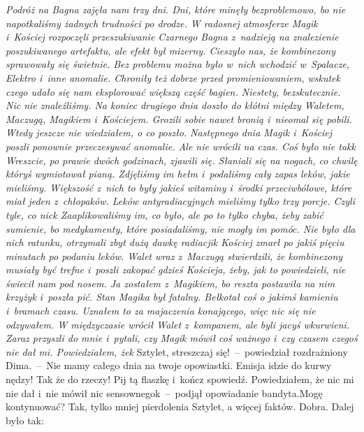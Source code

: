 \documentclass[../MAIN.tex]{subfiles}
\begin{document}
\dd
\textsl{Podróż na Bagna zajęła nam trzy dni. Dni, które minęły bezproblemowo, bo nie napotkaliśmy żadnych trudności po drodze. W radosnej atmosferze Magik i~Kościej rozpoczęli przeszukiwanie Czarnego Bagna z~nadzieją na znalezienie poszukiwanego artefaktu, ale efekt był mizerny. Cieszyło nas, że kombinezony sprawowały się świetnie. Bez problemu można było w~nich wchodzić w~Spalacze, Elektro i~inne anomalie. Chroniły też dobrze przed promieniowaniem, wskutek czego udało się nam eksplorować większą część bagien. Niestety, bezskutecznie. Nic nie znaleźliśmy. Na koniec drugiego dnia doszło do kłótni między Waletem, Maczugą, Magikiem i~Kościejem. Grozili sobie nawet bronią i~nieomal się pobili. Wtedy jeszcze nie wiedziałem, o co poszło. Następnego dnia Magik i~Kościej poszli ponownie przeczesywać anomalie. Ale nie wrócili na czas. Coś było nie tak\3k Wreszcie, po prawie dwóch godzinach, zjawili się. Słaniali się na nogach, co chwilę któryś wymiotował pianą. Zdjęliśmy im hełm i~podaliśmy cały zapas leków, jakie
mieliśmy.
Większość z~nich to były jakieś witaminy i~środki przeciwbólowe, które miał jeden z~chłopaków. Leków antyradiacyjnych mieliśmy tylko trzy porcje. Czyli tyle, co nic\3k Zaaplikowaliśmy im, co było, ale po to tylko chyba, żeby zabić sumienie, bo medykamenty, które posiadaliśmy, nie mogły im pomóc. Nie było dla nich ratunku, otrzymali zbyt dużą dawkę radiacji\3k Kościej zmarł po jakiś pięciu minutach po podaniu leków. Walet wraz z~Maczugą stwierdzili, że kombinezony musiały być trefne i~poszli zakopać gdzieś Kościeja, żeby, jak to powiedzieli, nie świecił nam pod nosem. Ja zostałem z~Magikiem, bo reszta postawiła na nim krzyżyk i~poszła pić. Stan Magika był fatalny. Bełkotał coś o jakimś kamieniu i~bramach czasu. Uznałem to za majaczenia konającego, więc nic się nie odzywałem. W międzyczasie wrócił Walet z~kompanem, ale byli jacyś wkurwieni. Zaraz przyszli do mnie i~pytali, czy Magik mówił coś ważnego i~czy czasem czegoś nie dał mi. Powiedziałem, że\3k}
%
\sx Sztylet, streszczaj się!~--~powiedział rozdrażniony Dima.~--~Nie mamy całego dnia na twoje opowiastki.
Emisja idzie do kurwy nędzy! Tak że do rzeczy! Pij tą flaszkę i~kończ spowiedź.
\xx Powiedziałem, że nic mi nie dał i~nie mówił nic sensownego\3k~--~podjął opowiadanie bandyta.\x Mogę kontynuować?
\xx Tak, tylko mniej pierdolenia Sztylet, a więcej faktów.
\xx Dobra. Dalej było tak:
\qm
\end{document}
